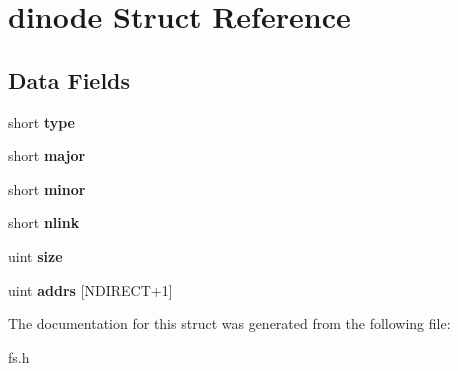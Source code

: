 \hypertarget{structdinode}{}\section{dinode Struct Reference}
\label{structdinode}
\subsection*{Data Fields}
\begin{DoxyCompactItemize}
\item 
\mbox{\label{structdinode_abf6b2a8476a803284f1c927fb3b82259}} 
short {\bfseries type}
\item 
\mbox{\label{structdinode_aca8272002020f48219df175c986db257}} 
short {\bfseries major}
\item 
\mbox{\label{structdinode_ae97965f85e7353313f85035e8fc63495}} 
short {\bfseries minor}
\item 
\mbox{\label{structdinode_a105562253b461c11413c9a229ef15358}} 
short {\bfseries nlink}
\item 
\mbox{\label{structdinode_a990ad8ddf5f8c051fbbe95cf550d2164}} 
uint {\bfseries size}
\item 
\mbox{\label{structdinode_a705729b3a39c10c0ba6927fc5e4e0563}} 
uint {\bfseries addrs} \mbox{[}N\+D\+I\+R\+E\+CT+1\mbox{]}
\end{DoxyCompactItemize}


The documentation for this struct was generated from the following file\+:\begin{DoxyCompactItemize}
\item 
fs.\+h\end{DoxyCompactItemize}
